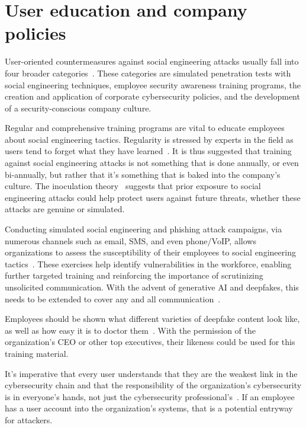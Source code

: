     


\section{User education and company policies}

User-oriented countermeasures against social engineering attacks usually fall into four broader categories~\citep{tsinganos_Towards_Automated_Recognition_Chat_SE_Enterprise_2018, mitnick_The_Art_of_Deception_2003}. These categories are simulated penetration tests with social engineering techniques, employee security awareness training programs, the creation and application of corporate cybersecurity policies, and the development of a security-conscious company culture.

Regular and comprehensive training programs are vital to educate employees about social engineering tactics. Regularity is stressed by experts in the field as users tend to forget what they have learned~\citep{hadnagy_Social_Engineering_The_Science_2018, mitnick_The_Art_of_Deception_2003}. It is thus suggested that training against social engineering attacks is not something that is done annually, or even bi-annually, but rather that it's something that is baked into the company's culture. The inoculation theory~\citep{blauth_AI_Crime_Overview_Malicious_Use_Abuse_2022} suggests that prior exposure to social engineering attacks could help protect users against future threats, whether these attacks are genuine or simulated.

Conducting simulated social engineering and phishing attack campaigns, via numerous channels such as email, SMS, and even phone/VoIP, allows organizations to assess the susceptibility of their employees to social engineering tactics~\citep{hadnagy_Social_Engineering_The_Science_2018}. These exercises help identify vulnerabilities in the workforce, enabling further targeted training and reinforcing the importance of scrutinizing unsolicited communication. With the advent of generative AI and deepfakes, this needs to be extended to cover any and all communication~\citep{mirsky_Creation_Detection_Deepfakes_2021}.

Employees should be shown what different varieties of deepfake content look like, as well as how easy it is to doctor them~\citep{mirsky_Creation_Detection_Deepfakes_2021}. With the permission of the organization’s CEO or other top executives, their likeness could be used for this training material.

It's imperative that every user understands that they are the weakest link in the cybersecurity chain and that the responsibility of the organization's cybersecurity is in everyone's hands, not just the cybersecurity professional's~\citep{mitnick_The_Art_of_Deception_2003}. If an employee has a user account into the organization’s systems, that is a potential entryway for attackers.

